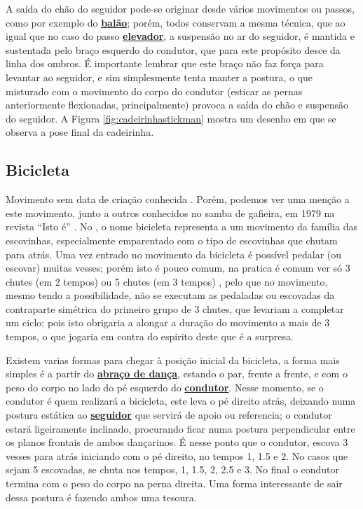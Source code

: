 A saída do chão do seguidor pode-se originar desde vários movimentos ou passos,
como por exemplo do  \hyperref[def:PassoBalao]{\textbf{balão}}; 
porém,
todos conservam a mesma técnica, que ao igual que  no caso do passo  \hyperref[def:PassoElevador]{\textbf{elevador}},
a suspensão no ar do seguidor, é mantida e sustentada pelo braço esquerdo do condutor,
que para este propósito  desce da linha dos ombros.
É importante lembrar que este braço não faz força para levantar ao seguidor, 
e sim simplesmente tenta manter a postura,
o que misturado com o movimento do corpo do condutor (esticar as pernas anteriormente flexionadas, principalmente)
provoca a saída do chão e suspensão do seguidor.
A Figura \ref{fig:cadeirinhastickman} mostra um desenho em que se observa a pose final da cadeirinha.


\subsection{Bicicleta}

Movimento sem data de criação conhecida \cite[pp. 143,144]{perna2002samba}.
Porém, podemos ver uma menção a este movimento, junto a outros conhecidos no samba de gafieira, 
em 1979 na revista ``Isto é'' \cite[pp. 89]{revista1979isto}.
No \AnoLivro, o nome bicicleta representa a um movimento da família das escovinhas,
especialmente emparentado com o tipo de escovinhas que chutam para atrás.
Uma vez entrado no movimento da bicicleta é possível pedalar (ou escovar) muitas vesses;
porém isto é pouco comum, na pratica é comum ver só 3 chutes (em 2 tempos) ou 5 chutes (em 3 tempos) ,
pelo que no movimento, mesmo tendo a possibilidade, 
não se executam as pedaladas ou escovadas da contraparte simétrica do primeiro grupo de 3 chutes,
que levariam a completar um ciclo;
pois isto obrigaria a alongar a duração do movimento a mais de 3 tempos,
o que jogaria em contra do espirito deste que é a surpresa.

Existem varias formas para chegar à posição inicial da bicicleta,  
a forma mais simples é a partir do \hyperref[def:abracodedanca]{\textbf{abraço de dança}},
estando o par, frente a frente, 
e com o peso do corpo no lado do pé esquerdo do \hyperref[def:Condutor]{\textbf{condutor}}.
Nesse momento, se o condutor é quem realizará a bicicleta, 
este leva o pé direito atrás,
deixando numa postura estática ao \hyperref[def:Seguidor]{\textbf{seguidor}} 
que servirá de apoio ou referencia;   
o condutor estará ligeiramente inclinado,
procurando ficar numa postura perpendicular entre os planos frontais de ambos dançarinos.
É nesse ponto que o condutor, escova 3 vesses para atrás iniciando com o pé direito,
no tempos 1, 1.5 e 2. No casos que sejam 5 escovadas, se chuta nos tempos,
1, 1.5, 2, 2.5 e 3. No final o condutor termina com o peso do corpo na perna direita.
Uma forma interessante de sair dessa postura é fazendo ambos uma tesoura.\\

